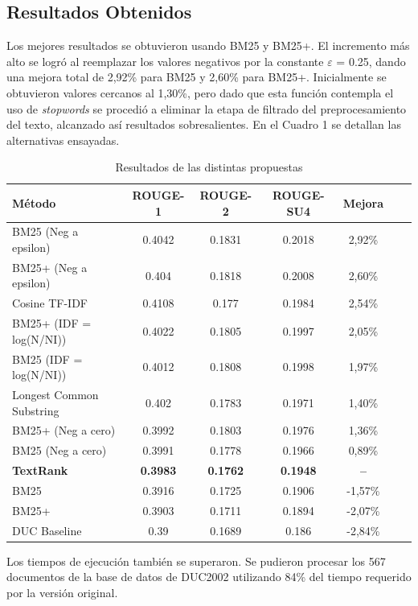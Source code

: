 \documentclass{llncs}
\begin{document}
\subsection{Resultados Obtenidos}
Los mejores resultados se obtuvieron usando BM25 y BM25+. El incremento más alto se logró al reemplazar los valores negativos por la constante $\varepsilon$ = 0.25, dando una mejora total de 2,92\% para BM25 y 2,60\% para BM25+. Inicialmente se obtuvieron valores cercanos al 1,30\%, pero dado que esta función contempla el uso de \textit{stopwords} se procedió a eliminar la etapa de filtrado del preprocesamiento del texto, alcanzado así resultados sobresalientes. En el Cuadro 1 se detallan las alternativas ensayadas.

\begin{table}
\caption{Resultados de las distintas propuestas}
\begin{center}
\begin{tabular}{l*{5}{c}r}
\hline
\rule{0pt}{12pt}
Método & ROUGE-1 & ROUGE-2 & ROUGE-SU4 & Mejora \\[2pt]
\hline\rule{0pt}{12pt}\mbox{}\par\nobreak
BM25 (Neg a epsilon) & 0.4042 & 0.1831 & 0.2018 & 2,92\% \\
BM25+ (Neg a epsilon) & 0.404 & 0.1818 & 0.2008 & 2,60\% \\
Cosine TF-IDF & 0.4108 & 0.177 & 0.1984 & 2,54\% \\
BM25+ (IDF = log(N/NI)) & 0.4022 & 0.1805 & 0.1997 & 2,05\% \\ 
BM25 (IDF = log(N/NI)) & 0.4012 & 0.1808 & 0.1998 & 1,97\% \\ 
Longest Common Substring & 0.402 & 0.1783 & 0.1971 & 1,40\% \\
BM25+ (Neg a cero) & 0.3992 & 0.1803 & 0.1976 & 1,36\% \\ 
BM25 (Neg a cero) & 0.3991 & 0.1778 & 0.1966 & 0,89\% \\
\textbf{TextRank} & \textbf{0.3983} & \textbf{0.1762} & \textbf{0.1948} & \textbf{--}\\
BM25 & 0.3916 & 0.1725 & 0.1906 & -1,57\% \\
BM25+ & 0.3903 & 0.1711 & 0.1894 & -2,07\% \\
DUC Baseline & 0.39 & 0.1689 & 0.186 & -2,84\% \\ [2pt]
\hline
\end{tabular}
\end{center}
\end{table}

Los tiempos de ejecución también se superaron. Se pudieron procesar los 567 documentos de la base de datos de DUC2002 utilizando 84\% del tiempo requerido por la versión original.
\end{document}
